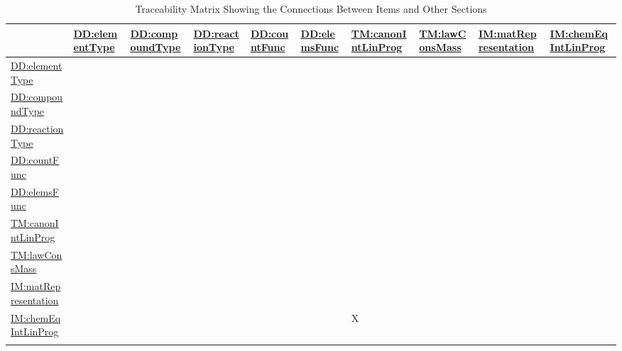\documentclass[12pt]{article}
\begin{document}
\begin{longtable}{l l l l l l l l l l}
\toprule
\textbf{} & \textbf{\hyperref[DD:elementType]{DD:elementType}} & \textbf{\hyperref[DD:compoundType]{DD:compoundType}} & \textbf{\hyperref[DD:reactionType]{DD:reactionType}} & \textbf{\hyperref[DD:countFunc]{DD:countFunc}} & \textbf{\hyperref[DD:elemsFunc]{DD:elemsFunc}} & \textbf{\hyperref[TM:canonIntLinProg]{TM:canonIntLinProg}} & \textbf{\hyperref[TM:lawConsMass]{TM:lawConsMass}} & \textbf{\hyperref[IM:matRepresentation]{IM:matRepresentation}} & \textbf{\hyperref[IM:chemEqIntLinProg]{IM:chemEqIntLinProg}}
\\
\midrule
\endhead
\hyperref[DD:elementType]{DD:elementType} &  &  &  &  &  &  &  &  & 
\\
\hyperref[DD:compoundType]{DD:compoundType} &  &  &  &  &  &  &  &  & 
\\
\hyperref[DD:reactionType]{DD:reactionType} &  &  &  &  &  &  &  &  & 
\\
\hyperref[DD:countFunc]{DD:countFunc} &  &  &  &  &  &  &  &  & 
\\
\hyperref[DD:elemsFunc]{DD:elemsFunc} &  &  &  &  &  &  &  &  & 
\\
\hyperref[TM:canonIntLinProg]{TM:canonIntLinProg} &  &  &  &  &  &  &  &  & 
\\
\hyperref[TM:lawConsMass]{TM:lawConsMass} &  &  &  &  &  &  &  &  & 
\\
\hyperref[IM:matRepresentation]{IM:matRepresentation} &  &  &  &  &  &  &  &  & 
\\
\hyperref[IM:chemEqIntLinProg]{IM:chemEqIntLinProg} &  &  &  &  &  & X &  &  & 
\\
\bottomrule
\caption{Traceability Matrix Showing the Connections Between Items and Other Sections}
\label{Table:TraceMatRefvsRef}
\end{longtable}
\end{document}
